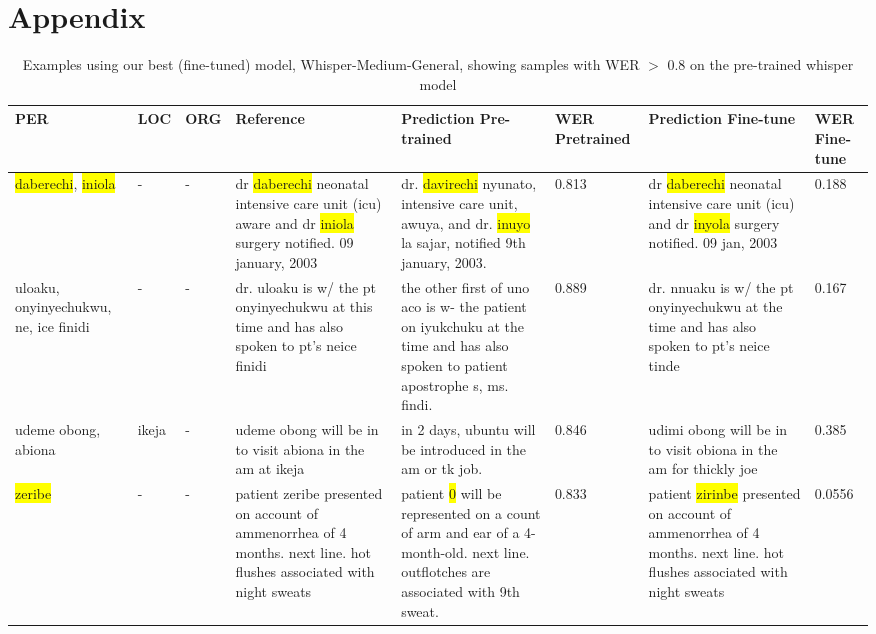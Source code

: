 \onecolumn
\appendix
\section{Appendix}
\begin{table}[h]
    \caption{Examples using our best (fine-tuned) model, Whisper-Medium-General, showing samples with WER $>$ 0.8 on the pre-trained whisper model}

    \tiny
    \centering
    \begin{tabular}{p{1cm}p{1cm}p{1cm}p{2.3cm}p{2.3cm}p{1cm}p{2.3cm}p{1cm}}
\toprule
PER &   LOC &  ORG &  Reference & Prediction Pre-trained &  WER Pretrained & Prediction Fine-tune &  WER Fine-tune \\
\midrule
\colorbox{yellow}{daberechi}, \colorbox{yellow}{iniola} & - & - & dr \colorbox{yellow}{daberechi} neonatal intensive care unit (icu) aware and dr \colorbox{yellow}{iniola} surgery notified. 09 january, 2003 & dr. \colorbox{yellow}{davirechi} nyunato, intensive care unit, awuya, and dr. \colorbox{yellow}{inuyo} la sajar, notified 9th january, 2003. & 0.813 & dr \colorbox{yellow}{daberechi} neonatal intensive care unit (icu) and dr \colorbox{yellow}{inyola} surgery notified. 09 jan, 2003 & 0.188 \\
\hline
uloaku, onyinyechukwu, ne, ice finidi & - & - & dr. uloaku is w/ the pt onyinyechukwu at this time and has also spoken to pt's neice finidi & the other first of uno aco is w- the patient on iyukchuku at the time and has also spoken to patient apostrophe s, ms. findi. & 0.889 & dr. nnuaku is w/ the pt onyinyechukwu at the time and has also spoken to pt's neice tinde & 0.167 \\
\hline
udeme obong, abiona & ikeja & - & udeme obong will be in to visit abiona in the am at ikeja & in 2 days, ubuntu will be introduced in the am or tk job. & 0.846 & udimi obong will be in to visit obiona in the am for thickly joe & 0.385 \\
\hline
\colorbox{yellow}{zeribe} & - & - & patient zeribe presented on account of ammenorrhea of 4 months. next line. hot flushes associated with night sweats & patient \colorbox{yellow}{0} will be represented on a count of arm and ear of a 4-month-old. next line. outflotches are associated with 9th sweat. & 0.833 & patient \colorbox{yellow}{zirinbe} presented on account of ammenorrhea of 4 months. next line. hot flushes associated with night sweats & 0.0556 \\

\end{tabular}
\end{table}
